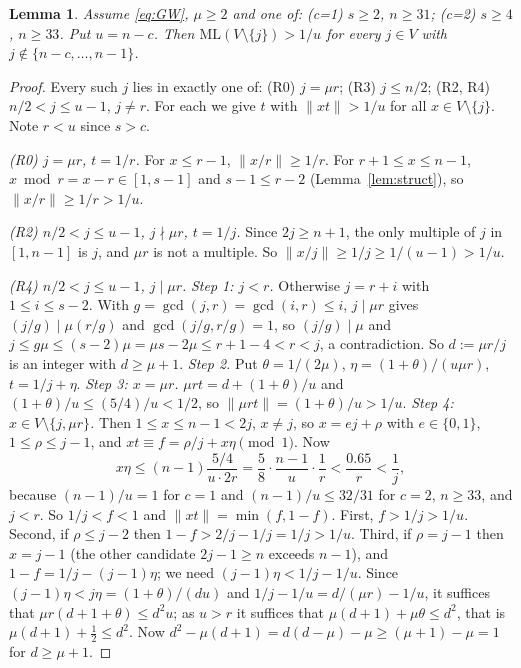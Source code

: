 \documentclass[11pt]{article}
\newtheorem{lemma}{Lemma}
\theoremstyle{remark}
\newcommand{\norm}[1]{\lVert #1\rVert}
\newcommand{\ML}{\mathrm{ML}}
\begin{document}
\begin{lemma}\label{lem:witness}
Assume \eqref{eq:GW}, $\mu\ge2$ and one of: (c=1) $s\ge2$, $n\ge31$; (c=2) $s\ge4$, $n\ge33$. Put $u=n-c$. Then $\ML(V\setminus\{j\})>1/u$ for every $j\in V$ with $j\notin\{n-c,\dots,n-1\}$.
\end{lemma}
\begin{proof}
Every such $j$ lies in exactly one of: (R0) $j=\mu r$; (R3) $j\le n/2$; (R2, R4) $n/2<j\le u-1$, $j\ne r$. For each we give $t$ with $\norm{xt}>1/u$ for all $x\in V\setminus\{j\}$. Note $r<u$ since $s>c$.

\emph{(R0) $j=\mu r$, $t=1/r$.} For $x\le r-1$, $\norm{x/r}\ge1/r$. For $r+1\le x\le n-1$, $x\bmod r=x-r\in[1,s-1]$ and $s-1\le r-2$ (Lemma~\ref{lem:struct}), so $\norm{x/r}\ge1/r>1/u$.

\emph{(R2) $n/2<j\le u-1$, $j\nmid\mu r$, $t=1/j$.} Since $2j\ge n+1$, the only multiple of $j$ in $[1,n-1]$ is $j$, and $\mu r$ is not a multiple. So $\norm{x/j}\ge1/j\ge1/(u-1)>1/u$.

\emph{(R4) $n/2<j\le u-1$, $j\mid\mu r$.} \emph{Step 1: $j<r$.} Otherwise $j=r+i$ with $1\le i\le s-2$. With $g=\gcd(j,r)=\gcd(i,r)\le i$, $j\mid\mu r$ gives $(j/g)\mid\mu(r/g)$ and $\gcd(j/g,r/g)=1$, so $(j/g)\mid\mu$ and $j\le g\mu\le(s-2)\mu=\mu s-2\mu\le r+1-4<r<j$, a contradiction. So $d:=\mu r/j$ is an integer with $d\ge\mu+1$. \emph{Step 2.} Put $\theta=1/(2\mu)$, $\eta=(1+\theta)/(u\mu r)$, $t=1/j+\eta$. \emph{Step 3: $x=\mu r$.} $\mu rt=d+(1+\theta)/u$ and $(1+\theta)/u\le(5/4)/u<1/2$, so $\norm{\mu rt}=(1+\theta)/u>1/u$. \emph{Step 4: $x\in V\setminus\{j,\mu r\}$.} Then $1\le x\le n-1<2j$, $x\ne j$, so $x=ej+\rho$ with $e\in\{0,1\}$, $1\le\rho\le j-1$, and $xt\equiv f=\rho/j+x\eta\pmod1$. Now
\[
x\eta\le(n-1)\frac{5/4}{u\cdot2r}=\frac58\cdot\frac{n-1}{u}\cdot\frac1r<\frac{0.65}{r}<\frac1j,
\]
because $(n-1)/u=1$ for $c=1$ and $(n-1)/u\le32/31$ for $c=2$, $n\ge33$, and $j<r$. So $1/j<f<1$ and $\norm{xt}=\min(f,1-f)$. First, $f>1/j>1/u$. Second, if $\rho\le j-2$ then $1-f>2/j-1/j=1/j>1/u$. Third, if $\rho=j-1$ then $x=j-1$ (the other candidate $2j-1\ge n$ exceeds $n-1$), and $1-f=1/j-(j-1)\eta$; we need $(j-1)\eta<1/j-1/u$. Since $(j-1)\eta<j\eta=(1+\theta)/(du)$ and $1/j-1/u=d/(\mu r)-1/u$, it suffices that $\mu r(d+1+\theta)\le d^2u$; as $u>r$ it suffices that $\mu(d+1)+\mu\theta\le d^2$, that is $\mu(d+1)+\tfrac12\le d^2$. Now $d^2-\mu(d+1)=d(d-\mu)-\mu\ge(\mu+1)-\mu=1$ for $d\ge\mu+1$.


\end{proof}
\end{document}
